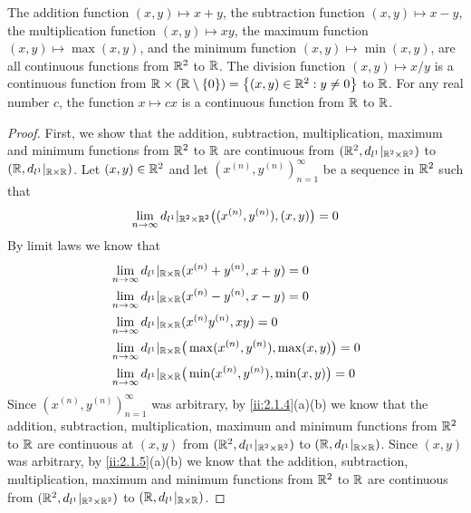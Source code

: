 \begin{lem}\label{ii:2.2.2}
  The addition function \((x, y) \mapsto x + y\), the subtraction function \((x, y) \mapsto x - y\), the multiplication function \((x, y) \mapsto xy\), the maximum function \((x, y) \mapsto \max(x, y)\), and the minimum function \((x, y) \mapsto \min(x, y)\), are all continuous functions from \(\mathbb{R}^2\) to \(\mathbb{R}\).
  The division function \((x, y) \mapsto x / y\) is a continuous function from \(\mathbb{R} \times (\mathbb{R} \setminus \left\lbrace0\right\rbrace) = \left\lbrace(x, y) \in \mathbb{R}^2 : y \neq 0\right\rbrace\) to \(\mathbb{R}\).
  For any real number \(c\), the function \(x \mapsto cx\) is a continuous function from \(\mathbb{R}\) to \(\mathbb{R}\).
\end{lem}

\begin{proof}
  First, we show that the addition, subtraction, multiplication, maximum and minimum functions from \(\mathbb{R}^2\) to \(\mathbb{R}\) are continuous from \((\mathbb{R}^2, d_{l^1}|_{\mathbb{R}^2 \times \mathbb{R}^2})\) to \((\mathbb{R}, d_{l^1}|_{\mathbb{R} \times \mathbb{R}})\).
  Let \((x, y) \in \mathbb{R}^2\) and let \((x^{(n)}, y^{(n)})_{n = 1}^\infty\) be a sequence in \(\mathbb{R}^2\) such that
  \[
    \lim_{n \to \infty} d_{l^1}|_{\mathbb{R}^2 \times \mathbb{R}^2}\big((x^{(n)}, y^{(n)}), (x, y)\big) = 0
  \]
  By limit laws we know that
  \begin{align*}
     & \lim_{n \to \infty} d_{l^1}|_{\mathbb{R} \times \mathbb{R}}(x^{(n)} + y^{(n)}, x + y) = 0                   \\
     & \lim_{n \to \infty} d_{l^1}|_{\mathbb{R} \times \mathbb{R}}(x^{(n)} - y^{(n)}, x - y) = 0                   \\
     & \lim_{n \to \infty} d_{l^1}|_{\mathbb{R} \times \mathbb{R}}(x^{(n)} y^{(n)}, xy) = 0                        \\
     & \lim_{n \to \infty} d_{l^1}|_{\mathbb{R} \times \mathbb{R}}\big(\max(x^{(n)}, y^{(n)}), \max(x, y)\big) = 0 \\
     & \lim_{n \to \infty} d_{l^1}|_{\mathbb{R} \times \mathbb{R}}\big(\min(x^{(n)}, y^{(n)}), \min(x, y)\big) = 0 \\
  \end{align*}
  Since \((x^{(n)}, y^{(n)})_{n = 1}^\infty\) was arbitrary, by \cref{ii:2.1.4}(a)(b) we know that the addition, subtraction, multiplication, maximum and minimum functions from \(\mathbb{R}^2\) to \(\mathbb{R}\) are continuous at \((x, y)\) from \((\mathbb{R}^2, d_{l^1}|_{\mathbb{R}^2 \times \mathbb{R}^2})\) to \((\mathbb{R}, d_{l^1}|_{\mathbb{R} \times \mathbb{R}})\).
  Since \((x, y)\) was arbitrary, by \cref{ii:2.1.5}(a)(b) we know that the addition, subtraction, multiplication, maximum and minimum functions from \(\mathbb{R}^2\) to \(\mathbb{R}\) are continuous from \((\mathbb{R}^2, d_{l^1}|_{\mathbb{R}^2 \times \mathbb{R}^2})\) to \((\mathbb{R}, d_{l^1}|_{\mathbb{R} \times \mathbb{R}})\).


\end{proof}
